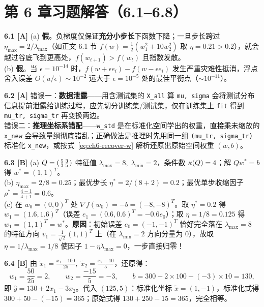 \section{第 6 章习题解答（6.1--6.8）}

\textbf{6.1 [A]}
(a) \textbf{假}。负梯度仅保证\textbf{充分小步长}下函数下降；一旦步长跨过 $\eta_{\max}=2/\lambda_{\max}$（如正文 6.1 节 $f(w)=\frac{1}{2}(w_1^2+10w_2^2)$ 取 $\eta=0.21 > 0.2$），就会越过谷底飞到更高处，$f(w_{t+1}) > f(w_t)$ 且指数发散。\\
(b) \textbf{假}。当 $\epsilon=10^{-14}$ 时，$f(w+\epsilon e_i)-f(w-\epsilon e_i)$ 发生严重灾难性抵消，浮点舍入误差 $O(u/\epsilon)\sim 10^{-2}$ 远大于 $\epsilon=10^{-5}$ 处的最佳平衡点（$\sim 10^{-11}$）。

\textbf{6.2 [A]}
错误一：\textbf{数据泄露}——用含测试集的 \texttt{X\_all} 算 \texttt{mu, sigma} 会将测试分布信息提前泄露给训练过程，应先切分训练集/测试集，仅在训练集上 \texttt{fit} 得到 \texttt{mu\_tr, sigma\_tr} 再变换两边。\\
错误二：\textbf{推理坐标系错配}——\texttt{w\_std} 是在标准化空间学出的权重，直接乘未缩放的 \texttt{x\_new} 会导致量纲彻底错乱；正确做法是推理时先用同一组 \texttt{(mu\_tr, sigma\_tr)} 标准化 \texttt{x\_new}，或按式~\eqref{eq:ch6-recover-w} 解析还原出原始空间权重 $(w, b)$。

\textbf{6.3 [B]}
(a) $Q=\begin{psmallmatrix}5&3\\3&5\end{psmallmatrix}$ 特征值 $\lambda_{\max}=8,\; \lambda_{\min}=2$，条件数 $\kappa(Q)=4$；解 $Qw^*=b$ 得 $w^*=(1,1)^T$。\\
(b) $\eta_{\max} = 2/8 = 0.25$；最优步长 $\eta^* = 2/(8+2) = 0.2$；最优单步收缩因子 $\rho^* = \frac{4-1}{4+1} = 0.6$。\\
(c) 在 $w_0=(0,0)^T$ 处 $\nabla f(w_0) = -b = (-8,-8)^T$。取 $\eta^*=0.2$ 得 $w_1 = (1.6, 1.6)^T$（误差 $e_1=(0.6,0.6)^T = -0.6 e_0$）；取 $\eta=1/8=0.125$ 得 $w_1 = (1,1)^T = w^*$。\textbf{原因}：初始误差 $e_0 = (-1,-1)^T$ 恰好完全落在 $\lambda_{\max}=8$ 的特征方向 $v_1=\frac{1}{\sqrt{2}}(1,1)^T$ 上（在 $\lambda_{\min}=2$ 方向分量为 $0$），故取 $\eta=1/\lambda_{\max}=1/8$ 使因子 $1-\eta\lambda_{\max} = 0$，一步直接归零！

\textbf{6.4 [B]}
由 $\tilde{x}_1 = \frac{x_1-100}{25},\; \tilde{x}_2 = \frac{x_2-10}{5}$，还原得：
\[
  w_1 = \frac{50}{25} = 2,\qquad w_2 = \frac{-15}{5} = -3,\qquad
  b = 300 - 2\times 100 - (-3)\times 10 = 130,
\]
即 $\hat{y} = 130 + 2x_1 - 3x_2$。代入 $(125, 5)$：标准化坐标 $\tilde{x}=(1, -1)$，标准化式得 $300+50-(-15)=365$；原始式得 $130+250-15=365$，完全相等。

